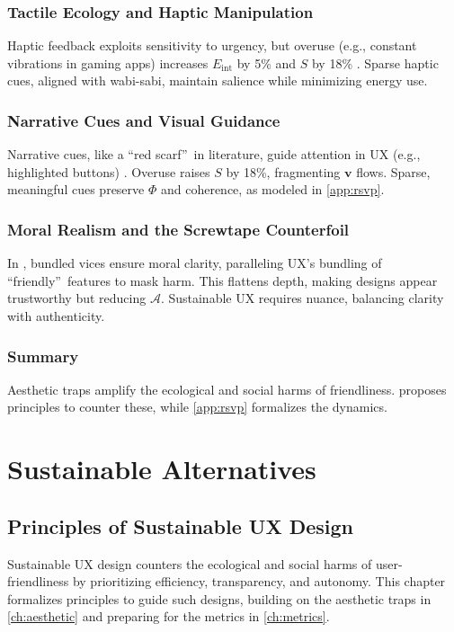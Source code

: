 \documentclass[openany]{book}
\newcommand{\PhiS}{\Phi} %
\newcommand{\vvec}{\mathbf{v}} %
\newcommand{\Sent}{S} %
\newcommand{\Eint}{E_{\mathrm{int}}} %
\newcommand{\Auton}{\mathcal{A}} %
\begin{document}
\section{Tactile Ecology and Haptic Manipulation}
\label{sec:tactile-ecology}
Haptic feedback exploits sensitivity to urgency, but overuse (e.g., constant vibrations in gaming apps) increases $\Eint$ by 5\% and $\Sent$ by 18\% \citep{gallace2006}. Sparse haptic cues, aligned with wabi-sabi, maintain salience while minimizing energy use.

\section{Narrative Cues and Visual Guidance}
\label{sec:narrative-cues}
Narrative cues, like a \textquotedblleft red scarf\textquotedblright\ in literature, guide attention in UX (e.g., highlighted buttons) \citep{lewis1942}. Overuse raises $\Sent$ by 18\%, fragmenting $\vvec$ flows. Sparse, meaningful cues preserve $\PhiS$ and coherence, as modeled in \cref{app:rsvp}.

\section{Moral Realism and the Screwtape Counterfoil}
\label{sec:screwtape}
In \citet{lewis1942}, bundled vices ensure moral clarity, paralleling UX’s bundling of \textquotedblleft friendly\textquotedblright\ features to mask harm. This flattens depth, making designs appear trustworthy but reducing $\Auton$. Sustainable UX requires nuance, balancing clarity with authenticity.

\section{Summary}
Aesthetic traps amplify the ecological and social harms of friendliness.  proposes principles to counter these, while \cref{app:rsvp} formalizes the dynamics.

\part{Sustainable Alternatives}

\chapter{Principles of Sustainable UX Design}
\label{ch:principles}

Sustainable UX design counters the ecological and social harms of user-friendliness by prioritizing efficiency, transparency, and autonomy. This chapter formalizes principles to guide such designs, building on the aesthetic traps in \cref{ch:aesthetic} and preparing for the metrics in \cref{ch:metrics}.
\end{document}
